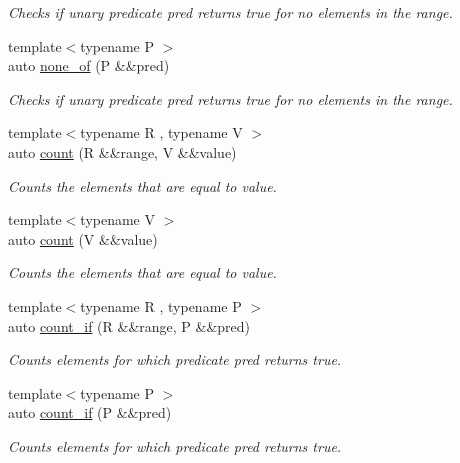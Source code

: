 \begin{DoxyCompactItemize}
\begin{DoxyCompactList}\small\item\em Checks if unary predicate pred returns true for no elements in the range. \end{DoxyCompactList}\item 
{\footnotesize template$<$typename P $>$ }\\auto \mbox{\hyperlink{namespacerah_aa05e58774ee8e9e05cd3e6ed2a2fa372}{none\+\_\+of}} (P \&\&pred)
\begin{DoxyCompactList}\small\item\em Checks if unary predicate pred returns true for no elements in the range. \end{DoxyCompactList}\item 
{\footnotesize template$<$typename R , typename V $>$ }\\auto \mbox{\hyperlink{namespacerah_aa528865cc4a45d4eb276329554f16b4b}{count}} (R \&\&range, V \&\&value)
\begin{DoxyCompactList}\small\item\em Counts the elements that are equal to value. \end{DoxyCompactList}\item 
{\footnotesize template$<$typename V $>$ }\\auto \mbox{\hyperlink{namespacerah_ae8400202fc4005dbade0f479dd556ec3}{count}} (V \&\&value)
\begin{DoxyCompactList}\small\item\em Counts the elements that are equal to value. \end{DoxyCompactList}\item 
{\footnotesize template$<$typename R , typename P $>$ }\\auto \mbox{\hyperlink{namespacerah_a8e6a379c05d482a52137f5647783fe27}{count\+\_\+if}} (R \&\&range, P \&\&pred)
\begin{DoxyCompactList}\small\item\em Counts elements for which predicate pred returns true. \end{DoxyCompactList}\item 
{\footnotesize template$<$typename P $>$ }\\auto \mbox{\hyperlink{namespacerah_a9e22b56a1f28a353659fed572f33f5a9}{count\+\_\+if}} (P \&\&pred)
\begin{DoxyCompactList}\small\item\em Counts elements for which predicate pred returns true. \end{DoxyCompactList}\item 

\end{DoxyCompactItemize}

